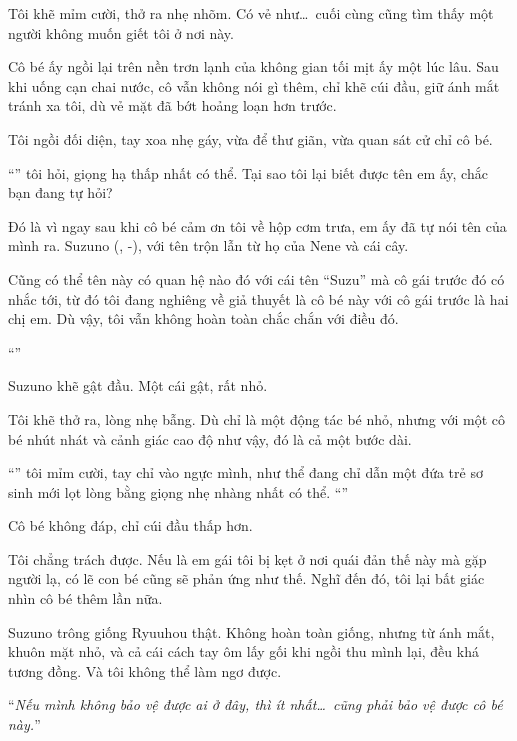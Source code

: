 \documentclass[../main.tex]{subfiles}
\begin{document}
Tôi khẽ mỉm cười, thở ra nhẹ nhõm. Có vẻ như\dots\ cuối cùng cũng tìm thấy một người không muốn giết tôi ở nơi này.

\ct

Cô bé ấy ngồi lại trên nền trơn lạnh của không gian tối mịt ấy một lúc lâu. Sau khi uống cạn chai nước, cô vẫn không nói gì thêm, chỉ khẽ cúi đầu, giữ ánh mắt tránh xa tôi, dù vẻ mặt đã bớt hoảng loạn hơn trước.

Tôi ngồi đối diện, tay xoa nhẹ gáy, vừa để thư giãn, vừa quan sát cử chỉ cô bé.

``'' tôi hỏi, giọng hạ thấp nhất có thể. Tại sao tôi lại biết được tên em ấy, chắc bạn đang tự hỏi?

Đó là vì ngay sau khi cô bé cảm ơn tôi về hộp cơm trưa, em ấy đã tự nói tên của mình ra. Suzuno (, -), với tên trộn lẫn từ họ của Nene và cái cây.

Cũng có thể tên này có quan hệ nào đó với cái tên ``Suzu'' mà cô gái trước đó có nhắc tới, từ đó tôi đang nghiêng về giả thuyết là cô bé này với cô gái trước là hai chị em. Dù vậy, tôi vẫn không hoàn toàn chắc chắn với điều đó.

``''

Suzuno khẽ gật đầu. Một cái gật, rất nhỏ.

Tôi khẽ thở ra, lòng nhẹ bẫng. Dù chỉ là một động tác bé nhỏ, nhưng với một cô bé nhút nhát và cảnh giác cao độ như vậy, đó là cả một bước dài.

``'' tôi mỉm cười, tay chỉ vào ngực mình, như thể đang chỉ dẫn một đứa trẻ sơ sinh mới lọt lòng bằng giọng nhẹ nhàng nhất có thể. ``''

Cô bé không đáp, chỉ cúi đầu thấp hơn.

Tôi chẳng trách được. Nếu là em gái tôi bị kẹt ở nơi quái đản thế này mà gặp người lạ, có lẽ con bé cũng sẽ phản ứng như thế. Nghĩ đến đó, tôi lại bất giác nhìn cô bé thêm lần nữa.

Suzuno trông giống Ryuuhou thật. Không hoàn toàn giống, nhưng từ ánh mắt, khuôn mặt nhỏ, và cả cái cách tay ôm lấy gối khi ngồi thu mình lại, đều khá tương đồng. Và tôi không thể làm ngơ được.

``\textit{Nếu mình không bảo vệ được ai ở đây, thì ít nhất\dots\ cũng phải bảo vệ được cô bé này.}''
\end{document}
